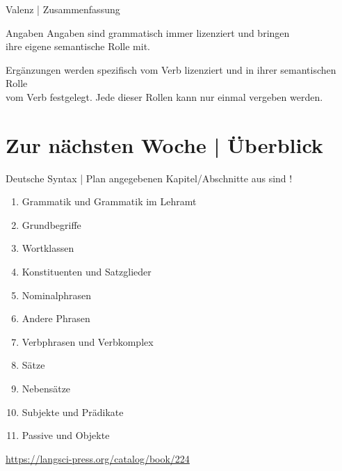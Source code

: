 \begin{frame}
  {Valenz | Zusammenfassung}
  \onslide<+->
  \onslide<+->
  \begin{block}{Angaben}
    \alert{Angaben} sind grammatisch immer lizenziert und bringen\\
    ihre eigene semantische Rolle mit.\\
    \Halbzeile
  \end{block}
  \Zeile
  \onslide<+->
  \begin{block}{Ergänzungen}
     werden spezifisch vom Verb lizenziert und in ihrer semantischen Rolle\\
    vom Verb festgelegt. Jede dieser Rollen kann nur einmal vergeben werden.
  \end{block}
\end{frame}




\ifdefined\TITLE
  \section{Zur nächsten Woche | Überblick}

  \begin{frame}
    {Deutsche Syntax | Plan}
     angegebenen Kapitel\slash Abschnitte aus  sind !\\
    \Halbzeile
    \begin{enumerate}
      \item Grammatik und Grammatik im Lehramt 
      \item Grundbegriffe 
      \item \alert{Wortklassen} 
      \item Konstituenten und Satzglieder 
      \item Nominalphrasen 
      \item Andere Phrasen 
      \item Verbphrasen und Verbkomplex 
      \item Sätze  
      \item Nebensätze 
      \item Subjekte und Prädikate 
      \item Passive und Objekte 
    \end{enumerate}
    \Halbzeile
    \centering 
    \url{https://langsci-press.org/catalog/book/224}
  \end{frame}
\fi
